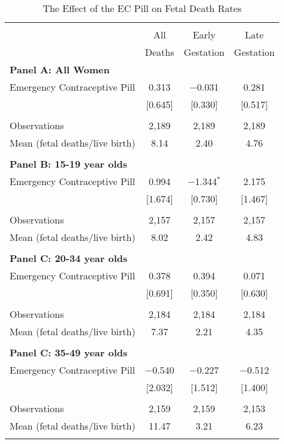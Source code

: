 \begin{table}[htpb!] \centering
\caption{The Effect of the EC Pill on Fetal Death Rates}
\label{TEENtab:DeathOLS}
\begin{tabular}{@{\extracolsep{5pt}}lccc}\\[-1.8ex]
\hline\hline\\[-1.8ex]
& All    & Early     & Late      \\
& Deaths & Gestation & Gestation \\ \midrule
\multicolumn{4}{l}{\noindent \textbf{
Panel A: All Women}} \\
Emergency Contraceptive Pill &0.313&$-$0.031&0.281\\
&[0.645]&[0.330]&[0.517]\\
& & & \\
Observations&2,189&2,189&2,189\\
Mean (fetal deaths/live birth)&8.14&2.40&4.76\\
&&&\\
\multicolumn{4}{l}{\noindent \textbf{
Panel B: 15-19 year olds}} \\
Emergency Contraceptive Pill &0.994&$-$1.344$^{*}$&2.175\\
&[1.674]&[0.730]&[1.467]\\
& & & \\
Observations&2,157&2,157&2,157\\
Mean (fetal deaths/live birth)&8.02&2.42&4.83\\
&&&\\
\multicolumn{4}{l}{\noindent \textbf{
Panel C: 20-34 year olds}} \\
Emergency Contraceptive Pill &0.378&0.394&0.071\\
&[0.691]&[0.350]&[0.630]\\
& & & \\
Observations&2,184&2,184&2,184\\
Mean (fetal deaths/live birth)&7.37&2.21&4.35\\
&&&\\
\multicolumn{4}{l}{\noindent \textbf{
Panel C: 35-49 year olds}} \\
Emergency Contraceptive Pill &$-$0.540&$-$0.227&$-$0.512\\
&[2.032]&[1.512]&[1.400]\\
& & & \\
Observations&2,159&2,159&2,153\\
Mean (fetal deaths/live birth)&11.47&3.21&6.23\\
\hline \hline \\[-1.8ex]

\end{tabular}
\end{table}

